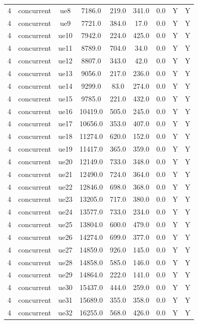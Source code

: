 \begin{table}[ht]
\begin{tabular}{|c|c|c|c|c|c|c|c|c|}
4 & concurrent & ue8 & 7186.0 & 219.0 & 341.0 & 0.0 & Y & Y \\
4 & concurrent & ue9 & 7721.0 & 384.0 & 17.0 & 0.0 & Y & Y \\
4 & concurrent & ue10 & 7942.0 & 224.0 & 425.0 & 0.0 & Y & Y \\
4 & concurrent & ue11 & 8789.0 & 704.0 & 34.0 & 0.0 & Y & Y \\
4 & concurrent & ue12 & 8807.0 & 343.0 & 42.0 & 0.0 & Y & Y \\
4 & concurrent & ue13 & 9056.0 & 217.0 & 236.0 & 0.0 & Y & Y \\
4 & concurrent & ue14 & 9299.0 & 83.0 & 274.0 & 0.0 & Y & Y \\
4 & concurrent & ue15 & 9785.0 & 221.0 & 432.0 & 0.0 & Y & Y \\
4 & concurrent & ue16 & 10419.0 & 505.0 & 245.0 & 0.0 & Y & Y \\
4 & concurrent & ue17 & 10656.0 & 353.0 & 407.0 & 0.0 & Y & Y \\
4 & concurrent & ue18 & 11274.0 & 620.0 & 152.0 & 0.0 & Y & Y \\
4 & concurrent & ue19 & 11417.0 & 365.0 & 359.0 & 0.0 & Y & Y \\
4 & concurrent & ue20 & 12149.0 & 733.0 & 348.0 & 0.0 & Y & Y \\
4 & concurrent & ue21 & 12490.0 & 724.0 & 364.0 & 0.0 & Y & Y \\
4 & concurrent & ue22 & 12846.0 & 698.0 & 368.0 & 0.0 & Y & Y \\
4 & concurrent & ue23 & 13205.0 & 717.0 & 380.0 & 0.0 & Y & Y \\
4 & concurrent & ue24 & 13577.0 & 733.0 & 234.0 & 0.0 & Y & Y \\
4 & concurrent & ue25 & 13804.0 & 600.0 & 479.0 & 0.0 & Y & Y \\
4 & concurrent & ue26 & 14274.0 & 699.0 & 377.0 & 0.0 & Y & Y \\
4 & concurrent & ue27 & 14859.0 & 926.0 & 145.0 & 0.0 & Y & Y \\
4 & concurrent & ue28 & 14858.0 & 585.0 & 146.0 & 0.0 & Y & Y \\
4 & concurrent & ue29 & 14864.0 & 222.0 & 141.0 & 0.0 & Y & Y \\
4 & concurrent & ue30 & 15437.0 & 444.0 & 259.0 & 0.0 & Y & Y \\
4 & concurrent & ue31 & 15689.0 & 355.0 & 358.0 & 0.0 & Y & Y \\
4 & concurrent & ue32 & 16255.0 & 568.0 & 426.0 & 0.0 & Y & Y \\

\end{tabular}
\end{table}
